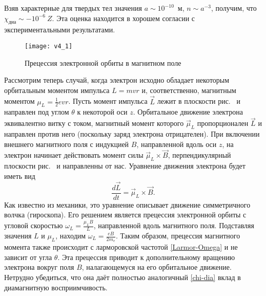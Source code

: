 Взяв характерные для твердых тел значения
$a \sim 10^{-10}$~м, $n\sim a^{-3}$, получим,
что $\chi_{диа} \sim -10^{-6}~Z$.
Эта оценка находится в хорошем согласии с экспериментальными результатами.

\begin{wrapfigure}[15]{r}{0.3\textwidth}
    \centering\texttt{[image: v4\_1]}
    \caption{Прецессия электронной орбиты в магнитном поле}
\end{wrapfigure}

Рассмотрим теперь случай, когда электрон исходно обладает некоторым
орбитальным моментом импульса $L=mvr$ и, соответственно,
магнитным моментом $\mu_L= \frac12 e v r$.
Пусть момент импульса $\vec{L}$ лежит в плоскости
рис.~ и направлен под углом $\theta$ к некоторой оси $z$.
Орбитальное движение электрона эквивалентно витку с током,
магнитный момент которого $\vec{\mu}_L$ пропорционален $\vec{L}$
и направлен против него (поскольку заряд электрона отрицателен).
При включении внешнего магнитного поля с индукцией $B$,
направленной вдоль оси $z$, на электрон начинает
действовать момент силы $\vec{\mu}_L\times \vec{B}$,
перпендикулярный плоскости рис.~ и направленны от
нас. Уравнение движения электрона будет иметь вид
\begin{equation*}
	\frac{d\vec{L}}{dt} = \vec{\mu}_L\times \vec{B}.
\end{equation*}
Как известно из механики, это уравнение описывает движение симметричного волчка
(гироскопа). Его решением является
прецессия электронной орбиты с угловой скоростью
$\omega_{L} = \frac{\mu_L B}{L}$,
направленной вдоль магнитного поля.
Подставляя значения $L$ и $\mu_L$, находим
$\omega_L = \frac{eB}{2m_e}$.
Таким образом, прецессия магнитного момента также происходит с ларморовской частотой
\eqref{Larmor-Omega}
и не зависит от угла $\theta$. Эта прецессия приводит
к дополнительному вращению электрона вокруг поля $B$,
налагающемуся на его орбитальное движение. Нетрудно убедиться, что она
даёт полностью аналогичный \eqref{chi-dia} вклад в диамагнитную восприимчивость.


